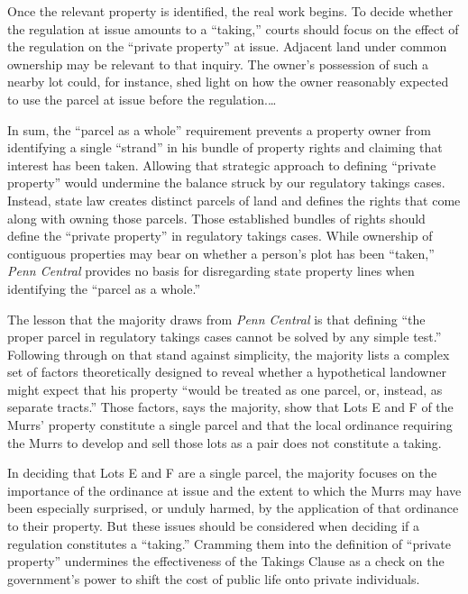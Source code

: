 Once the relevant property is identified, the real work begins. To decide
whether the regulation at issue amounts to a ``taking,'' courts should focus on
the effect of the regulation on the ``private property'' at issue. Adjacent land
under common ownership may be relevant to that inquiry. The owner's possession
of such a nearby lot could, for instance, shed light on how the owner reasonably
expected to use the parcel at issue before the regulation.\ldots

In sum, the ``parcel as a whole'' requirement prevents a property owner from
identifying a single ``strand'' in his bundle of property rights and claiming
that interest has been taken. Allowing that strategic approach to defining
``private property'' would undermine the balance struck by our regulatory
takings cases. Instead, state law creates distinct parcels of land and defines
the rights that come along with owning those parcels. Those established bundles
of rights should define the ``private property'' in regulatory takings cases.
While ownership of contiguous properties may bear on whether a person's plot has
been ``taken,'' \textit{Penn Central} provides no basis for disregarding state
property lines when identifying the ``parcel as a whole.''



The lesson that the majority draws from \textit{Penn Central} is that defining
``the proper parcel in regulatory takings cases cannot be solved by any simple
test.'' Following through on that stand against simplicity, the majority lists a
complex set of factors theoretically designed to reveal whether a hypothetical
landowner might expect that his property ``would be treated as one parcel, or,
instead, as separate tracts.'' Those factors, says the majority, show that Lots
E and F of the Murrs' property constitute a single parcel and that the local
ordinance requiring the Murrs to develop and sell those lots as a pair does not
constitute a taking.

In deciding that Lots E and F are a single parcel, the majority focuses on the
importance of the ordinance at issue and the extent to which the Murrs may have
been especially surprised, or unduly harmed, by the application of that
ordinance to their property. But these issues should be considered when deciding
if a regulation constitutes a ``taking.'' Cramming them into the definition of
``private property'' undermines the effectiveness of the Takings Clause as a
check on the government's power to shift the cost of public life onto private
individuals.

